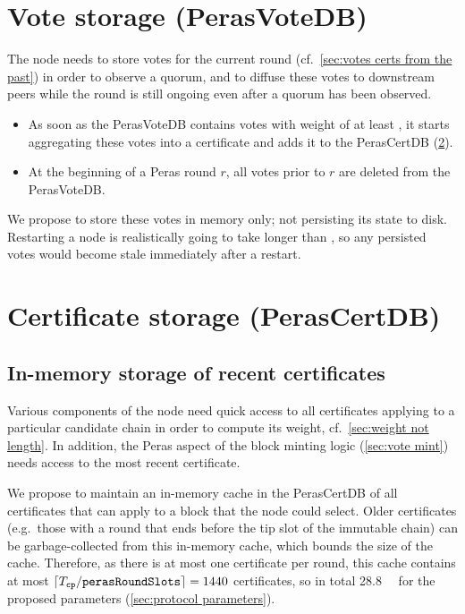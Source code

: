 \section{Vote storage (PerasVoteDB)}\label{sec:vote db}

The node needs to store votes for the current round (cf.~\cref{sec:votes certs from the past}) in order to observe a quorum, and to diffuse these votes to downstream peers while the round is still ongoing even after a quorum has been observed.

\begin{itemize}
\item
  As soon as the PerasVoteDB contains votes with weight of at least \perasQuorum, it starts aggregating these votes into a certificate and adds it to the PerasCertDB (\cref{sec:cert db}).
\item
  At the beginning of a Peras round $r$, all votes prior to $r$ are deleted from the PerasVoteDB\@.
\end{itemize}

We propose to store these votes in memory only; not persisting its state to disk.
Restarting a node is realistically going to take longer than \perasRoundSlots{}, so any persisted votes would become stale immediately after a restart.

\section{Certificate storage (PerasCertDB)}\label{sec:cert db}

\subsection{In-memory storage of recent certificates}
Various components of the node need quick access to all certificates applying to a particular candidate chain in order to compute its weight, cf.~\cref{sec:weight not length}.
In addition, the Peras aspect of the block minting logic (\cref{sec:vote mint}) needs access to the most recent certificate.

We propose to maintain an in-memory cache in the PerasCertDB of all certificates that can apply to a block that the node could select.
Older certificates (e.g.\ those with a round that ends before the tip slot of the immutable chain) can be garbage-collected from this in-memory cache, which bounds the size of the cache.
Therefore, as there is at most one certificate per round, this cache contains at most $\lceil T_{\mathtt{cp}} / \mathtt{perasRoundSlots} \rceil = 1440$ certificates, so in total \qty{28.8}{\mega\byte} for the proposed parameters (\cref{sec:protocol parameters}).

